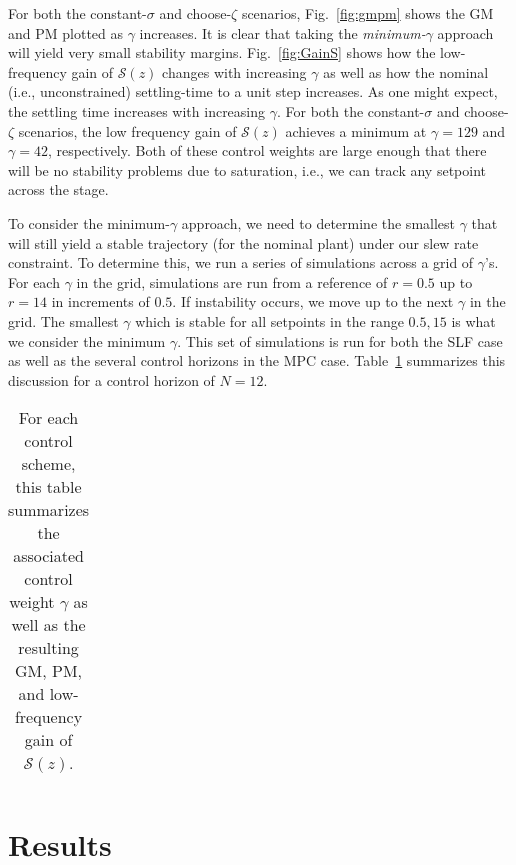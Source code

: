 \documentclass[journal,twocolumn,twoside]{IEEEtran}
\begin{document}
For both the constant-$\sigma$ and choose-$\zeta$ scenarios, Fig.~\ref{fig:gmpm} shows the GM and PM plotted as $\gamma$ increases. It is clear that taking the \emph{minimum-$\gamma$} approach will yield very small stability margins. Fig.~\ref{fig:GainS} shows how the low-frequency gain of $\mathcal{S}(z)$ changes with increasing $\gamma$ as well as how the nominal (i.e., unconstrained) settling-time to a unit step increases. As one might expect, the settling time increases with increasing $\gamma$. For both the constant-$\sigma$ and choose-$\zeta$ scenarios, the low frequency gain of $\mathcal{S}(z)$ achieves a minimum at ${\gamma=129}$ and $\gamma=42$, respectively. Both of these control weights are large enough that there will be no stability problems due to saturation, i.e., we can track any setpoint across the stage.

To consider the minimum-$\gamma$ approach, we need to determine the smallest $\gamma$ that will still yield a stable trajectory (for the nominal plant) under our slew rate constraint. To determine this, we run a series of simulations across a grid of $\gamma$'s. For each $\gamma$ in the grid, simulations are run from a reference of $r=0.5$ up to $r=14$ in increments of $0.5$. If instability occurs, we move up to the next $\gamma$ in the grid. The smallest $\gamma$ which is stable for all setpoints in the range $0.5, 15$ is what we consider the minimum $\gamma$. This set of simulations is run for both the SLF case as well as the several control horizons in the MPC case. Table~\ref{tab:gmpms} summarizes this discussion for a control horizon of $N=12$.

\begin{table}
  \caption{For each control scheme, this table summarizes the associated control weight $\gamma$ as well as the resulting GM, PM, and low-frequency gain of $\mathcal{S}(z)$.}
  \label{tab:gmpms}
  \begin{tabular}{ccccc}
    
  \end{tabular}
\end{table}

\section{Results}\label{sec:results}
%     
%     
\end{document}
